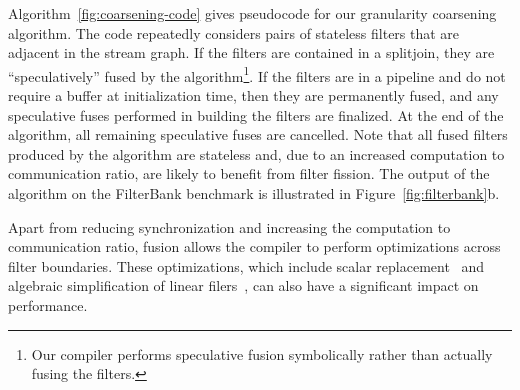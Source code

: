 Algorithm~\ref{fig:coarsening-code} gives pseudocode for our granularity
coarsening algorithm.  The code repeatedly considers pairs of
stateless filters that are adjacent in the stream graph.  If the
filters are contained in a splitjoin, they are ``speculatively'' fused
by the algorithm\footnote{Our compiler performs speculative fusion
symbolically rather than actually fusing the filters.}.  
If the filters are in a pipeline and do not require a buffer at
initialization time, then they are permanently fused, and any
speculative fuses performed in building the filters are finalized.  At
the end of the algorithm, all remaining speculative fuses are
cancelled.  Note that all fused filters produced by the algorithm are
stateless and, due to an increased computation to communication ratio,
are likely to benefit from filter fission.  The output of the
algorithm on the FilterBank benchmark is illustrated in
Figure~\ref{fig:filterbank}b.

Apart from reducing synchronization and increasing the computation to
communication ratio, fusion allows the compiler to perform
optimizations across filter boundaries.  These optimizations, which
include scalar replacement~\cite{sermulins:lctes:2005} and algebraic
simplification of linear filers~\cite{lamb:pldi:2003,agrawal:cases:2005}, can
also have a significant impact on performance.




